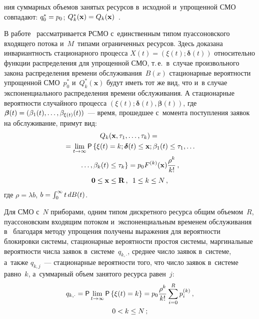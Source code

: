 \begin{multicols}{2}
\pagebreak

\noindent
ния 
суммарных объемов занятых ресурсов в~исходной и~упрощенной СМО совпадают: 
$q_0^*\hm=p_0$; $Q_k^*(\mathbf{x})\hm=Q_k(\mathbf{x})$~\cite{Naumov_3_2016}.

В работе~\cite{Sopin_16_2018} рассматривается РСМО с~единственным типом 
пуассоновского входящего потока и~$M$~типами ограниченных ресурсов.
Здесь доказана инвариантность стационарного процесса 
$X(t)=(\xi(t);\boldsymbol{\delta}(t))$ относительно функции распределения для 
упрощенной СМО, т.\,е.\ в~случае произвольного закона распределения времени 
обслуживания~$B(x)$ стационарные вероятности упрощенной СМО~$p^{*}_0$ 
и~$Q^{*}_k(\mathbf{x})$ будут иметь тот же вид, что и~в случае экспоненциального 
распределения времени обслуживания. А стационарные вероятности случайного 
процесса $(\xi(t);\boldsymbol{\delta}(t), \boldsymbol{\beta}(t))$, где 
$\boldsymbol{\beta}(t)\hm=(\beta_1(t),\ldots,\beta_{\xi(t)}(t))$~--- время, 
прошедшее с~момента поступления заявок на обслуживание, примут вид:
\begin{multline*}
Q_k(\mathbf{x},\tau_1,\ldots,\tau_k)={}\\
{}=\lim_{t\rightarrow \infty} {\sf P} \left\{ 
\xi(t)=k;\boldsymbol{\delta}(t)\leq \mathbf{x}; \beta_1(t) \leq 
\tau_1,\ldots\right.\\
\left.\ldots,\beta_k(t) \leq \tau_k  \right\}=
p_0 F^{(k)}(\mathbf{x})\displaystyle\frac{\displaystyle \rho^{k}\mathstrut}{\displaystyle k!\mathstrut}\,, \\
\mathbf{0} \leq \mathbf{x} \leq \mathbf{R}\,, \enskip 1\leq k \leq N\,,
\end{multline*}
где $\rho=\lambda b$, $b\hm=\int\nolimits_{0}^{\infty}t\,dB(t)$.

Для СМО с~$N$ приборами, одним типом дискретного ресурса общим объемом~$R$, 
пуассоновским входящим потоком и~экспоненциальным временем обслуживания 
в~\cite{Sopin_4_2015,Sopin_5_2015} благодаря методу упрощения получены выражения 
для вероятности блокировки сис\-те\-мы, стационарные вероятности простоя системы, 
маргинальные вероятности числа заявок в~сис\-те\-ме~$q_{k,\cdot}$, среднее чис\-ло 
заявок в~сис\-те\-ме, а~также $q_{k,j}$~--- стационарные вероятности того, что 
число заявок в~сис\-те\-ме равно~$k$, а~суммарный объем занятого ресурса равен~$j$:
\begin{multline*}
q_{k,\cdot}={\sf P}\lim_{t\rightarrow \infty}{\sf P}\left\{ \xi(t)=k 
\right\}=p_0\displaystyle\frac{\displaystyle \rho^k\mathstrut}{\displaystyle k!\mathstrut}\sum\limits_{i=0}^{R}p_i^{(k)}\,,
\\ 0<k\leq N\,;
\end{multline*}


\end{multicols}
